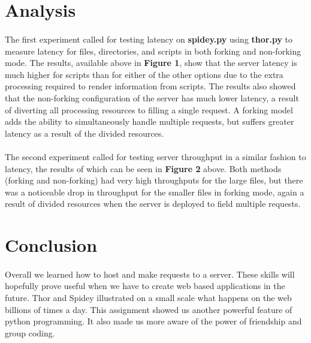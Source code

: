 \documentclass{article}
\begin{document}
\section{Analysis}

\paragraph{}

The first experiment called for testing latency on \textbf{spidey.py} using \textbf{thor.py} to measure latency for files, directories, and scripts in both forking and non-forking mode. The results, available above in \textbf{Figure 1}, show that the server latency is much higher for scripts than for either of the other options due to the extra processing required to render information from scripts. The results also showed that the non-forking configuration of the server has much lower latency, a result of diverting all processing resources to filling a single request. A forking model adds the ability to simultaneously handle multiple requests, but suffers greater latency as a result of the divided resources.

\paragraph{}
The second experiment called for testing server throughput in a similar fashion to latency, the results of which can be seen in \textbf{Figure 2} above. Both methods (forking and non-forking) had very high throughputs for the large files, but there was a noticeable drop in throughput for the smaller files in forking mode, again a result of divided resources when the server is deployed to field multiple requests.

\section{Conclusion}

\paragraph{}
 
Overall we learned how to host and make requests to a server. These skills will hopefully prove useful when we have to create web based applications in the future. Thor and Spidey illustrated on a small scale what happens on the web billions of times a day. This assignment showed us another powerful feature of python programming. It also made us more aware of the power of friendship and group coding. 
\end{document}
